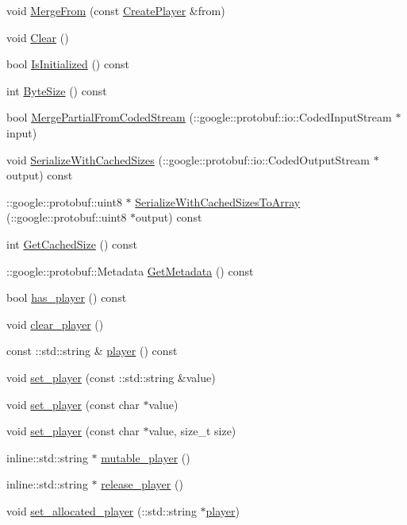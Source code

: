 \begin{DoxyCompactItemize}
void \hyperlink{class_create_player_a62af2ac4cd8c25d25fb40b24490dce71}{Merge\-From} (const \hyperlink{class_create_player}{Create\-Player} \&from)
\item 
void \hyperlink{class_create_player_a16a5331943d8f0cb80ea016c2f6536c1}{Clear} ()
\item 
bool \hyperlink{class_create_player_aac130736c0a2910be7f7b502c41e1803}{Is\-Initialized} () const 
\item 
int \hyperlink{class_create_player_a03f9cb31155e0379958b26d6ee0489d1}{Byte\-Size} () const 
\item 
bool \hyperlink{class_create_player_ab0ef8132426cd05a7942ea70fdb3ef7b}{Merge\-Partial\-From\-Coded\-Stream} (\-::google\-::protobuf\-::io\-::\-Coded\-Input\-Stream $\ast$input)
\item 
void \hyperlink{class_create_player_a9e670ed1b78c0db0c678bce985ca03e1}{Serialize\-With\-Cached\-Sizes} (\-::google\-::protobuf\-::io\-::\-Coded\-Output\-Stream $\ast$output) const 
\item 
\-::google\-::protobuf\-::uint8 $\ast$ \hyperlink{class_create_player_af968007dbfa9e09c137061676ff8013d}{Serialize\-With\-Cached\-Sizes\-To\-Array} (\-::google\-::protobuf\-::uint8 $\ast$output) const 
\item 
int \hyperlink{class_create_player_ab0f6a7f624e2a7f9228d9975338e43c7}{Get\-Cached\-Size} () const 
\item 
\-::google\-::protobuf\-::\-Metadata \hyperlink{class_create_player_a11570983e86bd3a1633488d4e3a0f517}{Get\-Metadata} () const 
\item 
bool \hyperlink{class_create_player_af2ffb8cd0a75402ad5fee111437d9a1a}{has\-\_\-player} () const 
\item 
void \hyperlink{class_create_player_a4f321cb527a655d1552cbe4b1948ddaa}{clear\-\_\-player} ()
\item 
const \-::std\-::string \& \hyperlink{class_create_player_a83b1387aa31d0b45ac3869b751b622c2}{player} () const 
\item 
void \hyperlink{class_create_player_a2db7b5bdd9a904e95cf9f6e692629dcf}{set\-\_\-player} (const \-::std\-::string \&value)
\item 
void \hyperlink{class_create_player_a0b88b81aaae8fd710466fd0a01e6b822}{set\-\_\-player} (const char $\ast$value)
\item 
void \hyperlink{class_create_player_aefe31b783cb70940616878c601f36a45}{set\-\_\-player} (const char $\ast$value, size\-\_\-t size)
\item 
inline\-::std\-::string $\ast$ \hyperlink{class_create_player_a1a2f1ea62c2005e3a40e58a84970e86e}{mutable\-\_\-player} ()
\item 
inline\-::std\-::string $\ast$ \hyperlink{class_create_player_a1b9edd8ec11c71202f139f21867d48f1}{release\-\_\-player} ()
\item 
void \hyperlink{class_create_player_ae7b000ed1c762919baee49272fe890f4}{set\-\_\-allocated\-\_\-player} (\-::std\-::string $\ast$\hyperlink{class_create_player_a83b1387aa31d0b45ac3869b751b622c2}{player})
\end{DoxyCompactItemize}
